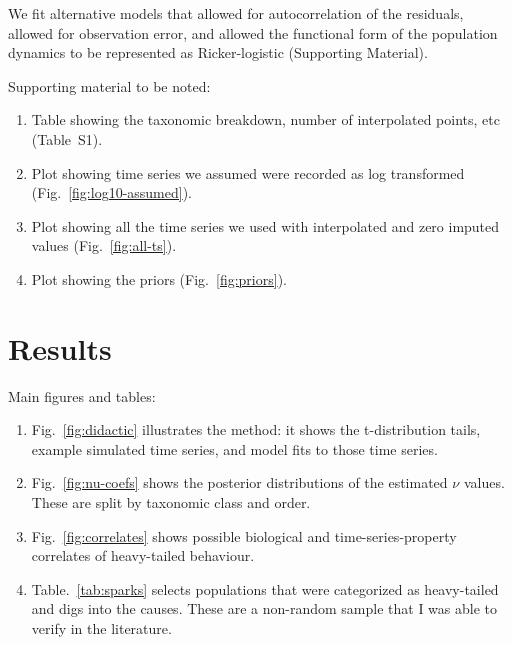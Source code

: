 \documentclass[12pt]{article}
\begin{document}
We fit alternative models that allowed for autocorrelation of the residuals, allowed for observation error, and allowed the functional form of the population dynamics to be represented as Ricker-logistic (Supporting Material).







\bigskip
Supporting material to be noted:

\begin{enumerate}

  \item Table showing the taxonomic breakdown, number of interpolated points, etc (Table~S1).

  \item Plot showing time series we assumed were recorded as log transformed  (Fig.~\ref{fig:log10-assumed}).

  \item Plot showing all the time series we used with interpolated and zero imputed values (Fig.~\ref{fig:all-ts}).

  \item Plot showing the priors (Fig.~\ref{fig:priors}).
\end{enumerate}

\section{Results}

Main figures and tables:

\begin{enumerate}
  \item Fig.~\ref{fig:didactic} illustrates the method: it shows the t-distribution tails, example simulated time series, and model fits to those time series.

  \item Fig.~\ref{fig:nu-coefs} shows the posterior distributions of the estimated $\nu$ values. These are split by taxonomic class and order.

  \item Fig.~\ref{fig:correlates} shows possible biological and time-series-property correlates of heavy-tailed behaviour.

  \item Table.~\ref{tab:sparks} selects populations that were categorized as heavy-tailed and digs into the causes. These are a non-random sample that I was able to verify in the literature.

\end{enumerate}
\end{document}
